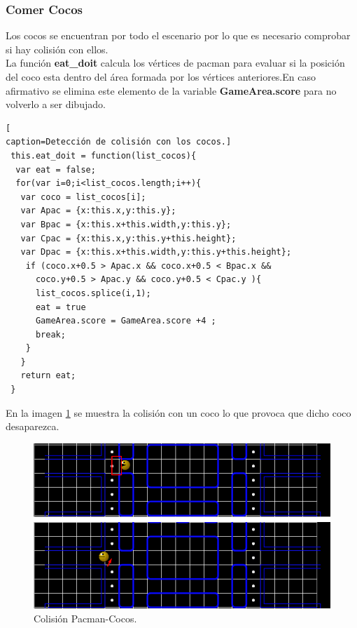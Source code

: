 \subsubsection*{Comer Cocos}
Los cocos se encuentran por todo el escenario por lo que es necesario comprobar si hay colisión con ellos. 
\\La función \textbf{eat\_doit} calcula los vértices de pacman para evaluar si la posición del coco esta dentro del área formada por los vértices anteriores.En caso afirmativo se elimina este elemento de la variable \textbf{GameArea.score} para no volverlo a ser dibujado.
\begin{lstlisting}[
caption=Detección de colisión con los cocos.]
 this.eat_doit = function(list_cocos){
  var eat = false;
  for(var i=0;i<list_cocos.length;i++){
   var coco = list_cocos[i];
   var Apac = {x:this.x,y:this.y};
   var Bpac = {x:this.x+this.width,y:this.y};
   var Cpac = {x:this.x,y:this.y+this.height};
   var Dpac = {x:this.x+this.width,y:this.y+this.height};
    if (coco.x+0.5 > Apac.x && coco.x+0.5 < Bpac.x && 
      coco.y+0.5 > Apac.y && coco.y+0.5 < Cpac.y ){
      list_cocos.splice(i,1);
      eat = true
      GameArea.score = GameArea.score +4 ;
      break;
    }
   }
   return eat;
 }
\end{lstlisting}
En la imagen \ref{fig:EatCoco1} se muestra la colisión con un coco lo que provoca que dicho coco desaparezca.
\begin{figure}[!h]
\begin{center}
   \includegraphics[width=0.5\linewidth]{Figures/EatCoco1}
	\decoRule
	\caption[Colisión Pacman-Cocos]{Colisión Pacman-Cocos.}
\label{fig:EatCoco1}
\end{center}
\end{figure}
